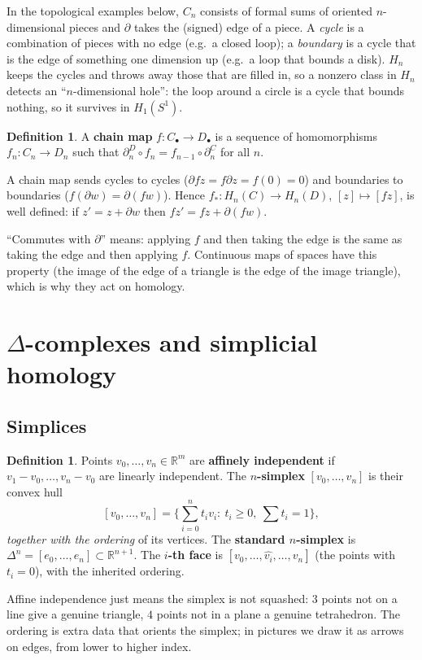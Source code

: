 \documentclass[11pt]{article}
\newcommand{\R}{\mathbb R}
\theoremstyle{definition}
\newtheorem{defn}[thm]{Definition}
\begin{document}
\begin{intuition}
In the topological examples below, $C_n$ consists of formal sums of oriented $n$-dimensional pieces and $\partial$ takes the (signed) edge of a piece. A \emph{cycle} is a combination of pieces with no edge (e.g.\ a closed loop); a \emph{boundary} is a cycle that is the edge of something one dimension up (e.g.\ a loop that bounds a disk). $H_n$ keeps the cycles and throws away those that are filled in, so a nonzero class in $H_n$ detects an ``$n$-dimensional hole'': the loop around a circle is a cycle that bounds nothing, so it survives in $H_1(S^1)$.
\end{intuition}

\begin{defn}
A \textbf{chain map} $f:C_\bullet\to D_\bullet$ is a sequence of homomorphisms $f_n:C_n\to D_n$ such that $\partial^D_n\circ f_n=f_{n-1}\circ\partial^C_n$ for all $n$.
\end{defn}
A chain map sends cycles to cycles ($\partial fz=f\partial z=f(0)=0$) and boundaries to boundaries ($f(\partial w)=\partial(fw)$). Hence $f_*:H_n(C)\to H_n(D)$, $[z]\mapsto[f z]$, is well defined: if $z'=z+\partial w$ then $fz'=fz+\partial(fw)$.
\begin{intuition}
``Commutes with $\partial$'' means: applying $f$ and then taking the edge is the same as taking the edge and then applying $f$. Continuous maps of spaces have this property (the image of the edge of a triangle is the edge of the image triangle), which is why they act on homology.
\end{intuition}

\section{$\Delta$-complexes and simplicial homology}

\subsection{Simplices}
\begin{defn}
Points $v_0,\dots,v_n\in\R^m$ are \textbf{affinely independent} if $v_1-v_0,\dots,v_n-v_0$ are linearly independent. The \textbf{$n$-simplex} $[v_0,\dots,v_n]$ is their convex hull
\[[v_0,\dots,v_n]=\Big\{\textstyle\sum_{i=0}^n t_iv_i:\ t_i\ge0,\ \sum t_i=1\Big\},\]
\emph{together with the ordering} of its vertices. The \textbf{standard $n$-simplex} is $\Delta^n=[e_0,\dots,e_n]\subset\R^{n+1}$. The \textbf{$i$-th face} is $[v_0,\dots,\widehat{v_i},\dots,v_n]$ (the points with $t_i=0$), with the inherited ordering.
\end{defn}
\begin{intuition}
Affine independence just means the simplex is not squashed: $3$ points not on a line give a genuine triangle, $4$ points not in a plane a genuine tetrahedron. The ordering is extra data that orients the simplex; in pictures we draw it as arrows on edges, from lower to higher index.
\end{intuition}
\end{document}
